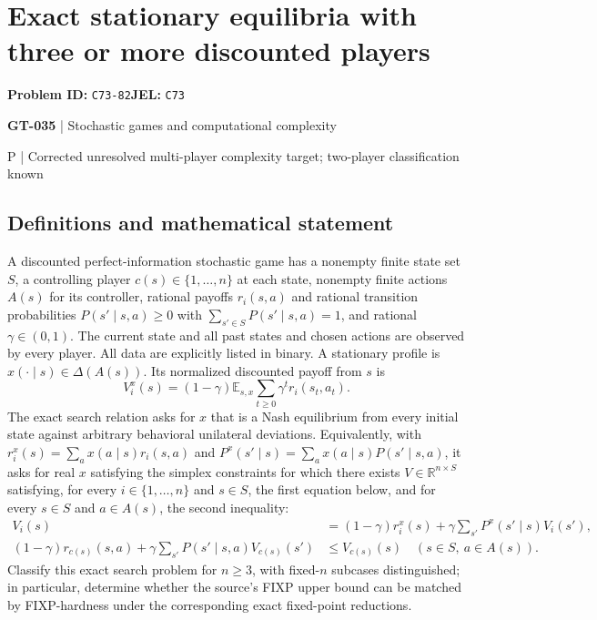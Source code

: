 \documentclass[11pt,a4paper]{article}
\newcommand{\R}{\mathbb R}
\begin{document}
\section*{Exact stationary equilibria with three or more discounted players}
\textbf{Problem ID:} \texttt{C73-82}\quad \textbf{JEL:} \texttt{C73}\par
\label{problem:OP-0165}
\label{game:GT-035}
{\sffamily\small\color{muted}
{\sffamily\small\color{muted}\textbf{GT-035} | Stochastic games and computational complexity\par P | Corrected unresolved multi-player complexity target; two-player classification known\par}
\par}
\subsection*{Definitions and mathematical statement}
A discounted perfect-information stochastic game has a nonempty finite state set $S$, a controlling player $c(s)\in\{1,\ldots,n\}$ at each state, nonempty finite actions $A(s)$ for its controller, rational payoffs $r_i(s,a)$ and rational transition probabilities $P(s'\mid s,a)\geq0$ with $\sum_{s'\in S}P(s'\mid s,a)=1$, and rational $\gamma\in(0,1)$. The current state and all past states and chosen actions are observed by every player. All data are explicitly listed in binary. A stationary profile is $x(\cdot\mid s)\in\Delta(A(s))$. Its normalized discounted payoff from $s$ is
\[
 V_i^x(s)=(1-\gamma)\mathbb E_{s,x}\sum_{t\geq0}\gamma^t r_i(s_t,a_t).
\]
The exact search relation asks for $x$ that is a Nash equilibrium from every initial state against arbitrary behavioral unilateral deviations. Equivalently, with
$r_i^x(s)=\sum_a x(a\mid s)r_i(s,a)$ and
$P^x(s'\mid s)=\sum_a x(a\mid s)P(s'\mid s,a)$, it asks for real $x$ satisfying the simplex constraints for which there exists $V\in\R^{n\times S}$ satisfying, for every $i\in\{1,\ldots,n\}$ and $s\in S$, the first equation below, and for every $s\in S$ and $a\in A(s)$, the second inequality:
\begin{align*}
 V_i(s)&=(1-\gamma)r_i^x(s)+\gamma\sum_{s'}P^x(s'\mid s)V_i(s'),\\
 (1-\gamma)r_{c(s)}(s,a)+\gamma\sum_{s'}P(s'\mid s,a)V_{c(s)}(s')&\leq V_{c(s)}(s)
 \quad(s\in S,\ a\in A(s)).
\end{align*}
Classify this exact search problem for $n\geq3$, with fixed-$n$ subcases distinguished; in particular, determine whether the source's FIXP upper bound can be matched by FIXP-hardness under the corresponding exact fixed-point reductions.
\end{document}

